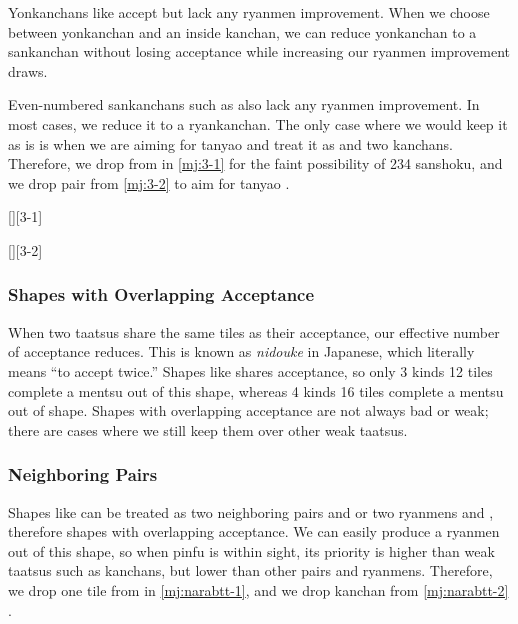 \documentclass[12pt]{article}
\begin{document}
Yonkanchans like  accept  but lack any ryanmen improvement. When we choose between yonkanchan and an inside kanchan, we can reduce yonkanchan to a sankanchan without losing acceptance while increasing our ryanmen improvement draws.

Even-numbered sankanchans such as  also lack any ryanmen improvement. In most cases, we reduce it to a ryankanchan. The only case where we would keep it as is is when we are aiming for tanyao and treat it as  and  two kanchans. Therefore, we drop  from  in \ref{mj:3-1} for the faint possibility of 234 sanshoku, and we drop  pair from \ref{mj:3-2} to aim for tanyao \citep{yuusee-2468}.

[][3-1]

[][3-2]


\subsubsection{Shapes with Overlapping Acceptance} \label{subsub:nidouke}

When two taatsus share the same tiles as their acceptance, our effective number of acceptance reduces. This is known as \textit{nidouke} in Japanese, which literally means ``to accept twice.'' Shapes like  shares  acceptance, so only  3 kinds 12 tiles complete a mentsu out of this shape, whereas  4 kinds 16 tiles complete a mentsu out of  shape. Shapes with overlapping acceptance are not always bad or weak; there are cases where we still keep them over other weak taatsus.


\subsubsection*{Neighboring Pairs}

Shapes like  can be treated as two neighboring pairs  and  or two ryanmens  and , therefore shapes with overlapping acceptance. We can easily produce a ryanmen out of this shape, so when pinfu is within sight, its priority is higher than weak taatsus such as kanchans, but lower than other pairs and ryanmens. Therefore, we drop one tile from  in \ref{mj:narabtt-1}, and we drop  kanchan from \ref{mj:narabtt-2} \citep[][pp. 112--113]{uzaku-haikouritsu}.
\end{document}
